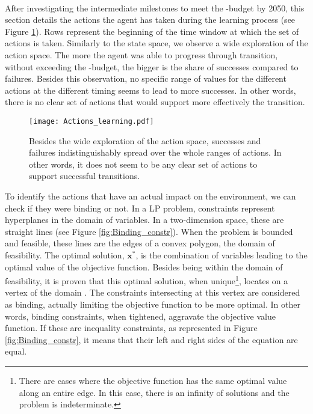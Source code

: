 \\

After investigating the intermediate milestones to meet the -budget by 2050, this section details the actions the agent has taken during the learning process (see Figure \ref{fig:Actions_learning}). Rows represent the beginning of the time window at which the set of actions is taken. Similarly to the state space, we observe a wide exploration of the action space. The more the agent was able to progress through transition, without exceeding the -budget, the bigger is the share of successes compared to failures. Besides this observation, no specific range of values for the different actions at the different timing seems to lead to more successes. In other words, there is no clear set of actions that would support more effectively the transition.

\begin{figure}[!htbp]
\centering
\texttt{[image: Actions\_learning.pdf]}
\caption{Besides the wide exploration of the action space, successes and failures indistinguishably spread over the whole ranges of actions. In other words, it does not seem to be any clear set of actions to support successful transitions.}
\label{fig:Actions_learning}
\end{figure}

To identify the actions that have an actual impact on the environment, we can check if they were binding or not. In a \gls{LP} problem, constraints represent hyperplanes in the domain of variables. In a two-dimension space, these are straight lines (see Figure \ref{fig:Binding_constr}). When the problem is bounded and feasible, these lines are the edges of a convex polygon, the domain of feasibility. The optimal solution, $\textbf{x}^*$, is the combination of variables leading to the optimal value of the objective function. Besides being within the domain of feasibility, it is proven that this optimal solution, when unique\footnote{There are cases where the objective function has the same optimal value along an entire edge. In this case, there is an infinity of solutions and the problem is indeterminate.}, locates on a vertex of the domain \cite{bertsimas1997introduction}. The constraints intersecting at this vertex are considered as binding, actually limiting the objective function to be more optimal. In other words, binding constraints, when tightened, aggravate the objective value function. If these are inequality constraints, as represented in Figure \ref{fig:Binding_constr}, it means that their left and right sides of the equation are equal.


